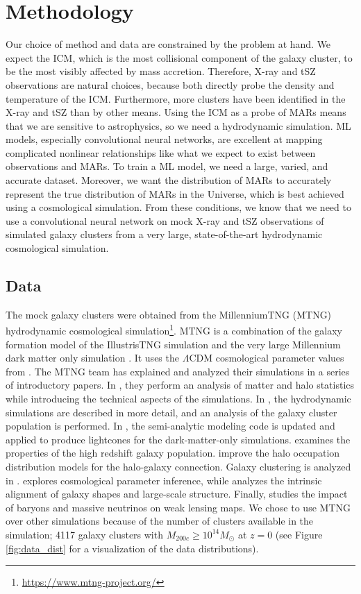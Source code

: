 \section{Methodology}\label{Ch4_methods}
Our choice of method and data are constrained by the problem at hand. We expect the ICM, which is the most collisional component of the galaxy cluster, to be the most visibly affected by mass accretion. Therefore, X-ray and tSZ observations are natural choices, because both directly probe the density and temperature of the ICM. Furthermore, more clusters have been identified in the X-ray and tSZ than by other means. Using the ICM as a probe of MARs means that we are sensitive to astrophysics, so we need a hydrodynamic simulation. ML models, especially convolutional neural networks, are excellent at mapping complicated nonlinear relationships like what we expect to exist between observations and MARs. To train a ML model, we need a large, varied, and accurate dataset. Moreover, we want the distribution of MARs to accurately represent the true distribution of MARs in the Universe, which is best achieved using a cosmological simulation. From these conditions, we know that we need to use a convolutional neural network on mock X-ray and tSZ observations of simulated galaxy clusters from a very large, state-of-the-art hydrodynamic cosmological simulation.

\subsection{Data}\label{Ch4_data}
The mock galaxy clusters were obtained from the MillenniumTNG (MTNG) hydrodynamic cosmological simulation\footnote{\url{https://www.mtng-project.org/}}. MTNG is a combination of the galaxy formation model of the IllustrisTNG simulation \cite{Nelson_2018, Pillepich_2018} and the very large Millennium dark matter only simulation \cite{Springel_2005}. It uses the $\Lambda$CDM cosmological parameter values from \cite{Planck_2015_Values}. The MTNG team has explained and analyzed their simulations in a series of introductory papers. In \cite{MTNG_1}, they perform an analysis of matter and halo statistics while introducing the technical aspects of the simulations. In \cite{MTNG_2}, the hydrodynamic simulations are described in more detail, and an analysis of the galaxy cluster population is performed. In \cite{MTNG_3}, the semi-analytic modeling code is updated and applied to produce lightcones for the dark-matter-only simulations. \cite{MTNG_4} examines the properties of the high redshift galaxy population. \cite{MTNG_6, MTNG_5} improve the halo occupation distribution models for the halo-galaxy connection. Galaxy clustering is analyzed in \cite{MTNG_7}. 
\cite{MTNG_8} explores cosmological parameter inference, while \cite{MTNG_9} analyzes the intrinsic alignment of galaxy shapes and large-scale structure. Finally, \cite{MTNG_10} studies the impact of baryons and massive neutrinos on weak lensing maps. We chose to use MTNG over other simulations because of the number of clusters available in the simulation; 4117 galaxy clusters with $M_{200c} \geq 10^{14} M_{\odot}$ at $z=0$ (see Figure \ref{fig:data_dist} for a visualization of the data distributions). 


